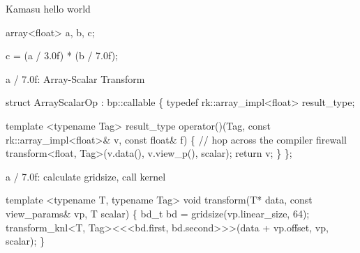 
\begin{frame}[fragile]{Kamasu hello world}
\begin{semiverbatim}

array<float> a, b, c;

\alert<2>{c = (a / 3.0f) * (b / 7.0f);}

\end{semiverbatim}
\note{

}
\end{frame}

\begin{frame}[fragile]{a / 7.0f:  Array-Scalar Transform}
\begin{semiverbatim}

struct ArrayScalarOp : bp::callable
\{
  typedef rk::array_impl<float> result_type;

  template <typename Tag>
  result_type 
  operator()(Tag, const rk::array_impl<float>& v, 
             const float& f)
  \{
    // hop across the compiler firewall
    transform<float, Tag>(v.data(), v.view_p(), scalar);
    return v;
  \}
\};


\end{semiverbatim}
\end{frame}


\begin{frame}[fragile]{a / 7.0f: calculate gridsize, call kernel}
\begin{semiverbatim}
template <typename T, typename Tag>
void 
transform(T* data, const view_params& vp, T scalar)
\{
   bd_t bd = gridsize(vp.linear_size, 64);
   transform_knl<T, Tag><\hskip0pt<\hskip0pt<bd.first, 
                           bd.second>\hskip0pt>\hskip0pt>(data + vp.offset, 
                                        vp, scalar);
\}
\end{semiverbatim}
\note{ 
}
\end{frame}


